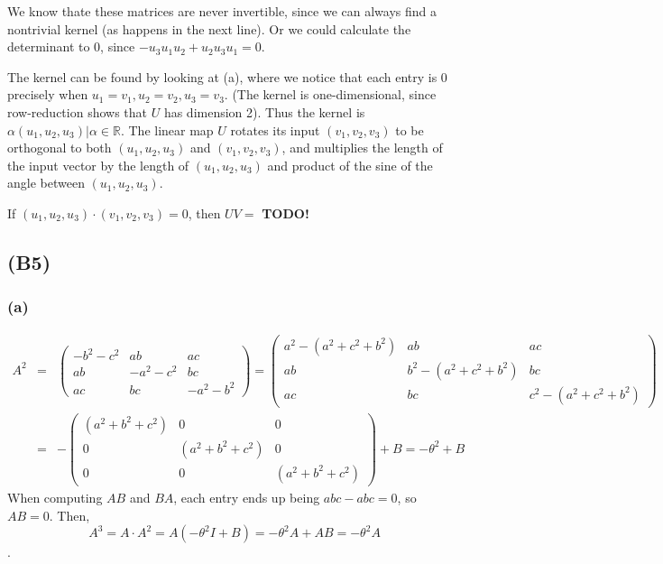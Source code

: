 \documentclass{article}
\newcommand{\reals}{\mathbb{R}}
\newcommand{\threematrix}[9]{\left(\begin{array}{ccc} #1 & #2 & #3\\ #4 & #5 & #6 \\ #7 & #8 & #9 \end{array}\right)}
\begin{document}
We know thate these matrices are never invertible, since we can always find a nontrivial kernel (as happens in the next line).
Or we could calculate the determinant to 0, since $-u_3u_1u_2 + u_2u_3u_1 = 0$.

The kernel can be found by looking at (a), where we notice that each entry is $0$ precisely when $u_1 = v_1, u_2 = v_2, u_3 = v_3$.
(The kernel is one-dimensional, since row-reduction shows that $U$ has dimension 2).
Thus the kernel is ${\alpha(u_1, u_2, u_3) | \alpha \in \reals}$.
The linear map $U$ rotates its input $(v_1, v_2, v_3)$ to be orthogonal to both $(u_1, u_2, u_3)$ and $(v_1, v_2, v_3)$, and multiplies the length of the input vector by the length of $(u_1, u_2, u_3)$ and product of the sine of the angle between $(u_1, u_2, u_3)$.

If $(u_1, u_2, u_3) \cdot (v_1, v_2, v_3) = 0$, then $UV = $ \textbf{TODO!}

\subsection{(B5)}
\subsubsection{(a)}
\begin{eqnarray*}
  A^2 &=& 
  \left( \begin{array}{ccc}
  -b^2 - c^2 & ab & ac\\
  ab & -a^2 - c^2 & bc\\
  ac & bc & -a^2 - b^2
  \end{array}\right) = 
  \left( \begin{array}{ccc}
  a^2 -(a^2 + c^2 + b^2) & ab & ac\\
  ab & b^2 -(a^2 + c^2 + b^2)& bc\\
  ac & bc & c^2 -(a^2 + c^2 + b^2)
  \end{array}\right) \\
  &=& -\threematrix{(a^2+b^2+c^2)}{0}{0}{0}{(a^2+b^2+c^2)}{0}{0}{0}{(a^2+b^2+c^2)}
  + B = -\theta^2 + B
\end{eqnarray*}
When computing $AB$ and $BA$, each entry ends up being $abc - abc = 0$, so $AB = 0$.
Then, \[A^3 = A\cdot A^2 = A(-\theta^2I + B) = -\theta^2A + AB = -\theta^2A\].
\end{document}
